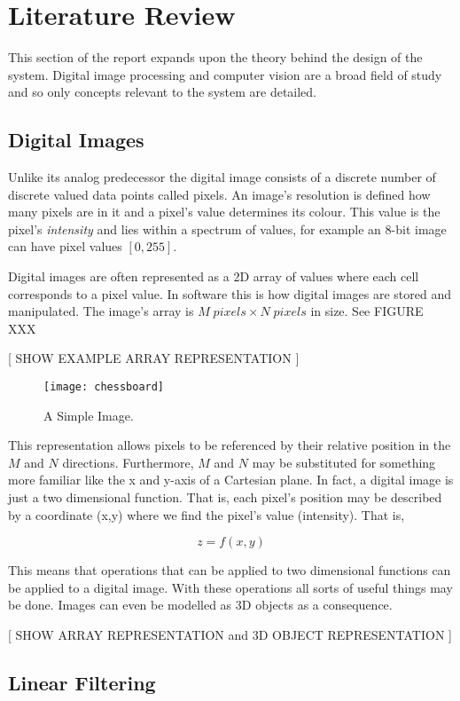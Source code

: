 \chapter{Literature Review}
This section of the report expands upon the theory behind the design of the system. Digital image processing and computer vision are a broad field of study and so only concepts relevant to the system are detailed.

\section{Digital Images}
Unlike its analog predecessor the digital image consists of a discrete number of discrete valued data points called pixels. An image's resolution is defined how many pixels are in it and a pixel's value determines its colour. This value is the pixel's \emph{intensity} and lies within a spectrum of values, for example an 8-bit image can have pixel values $[0, 255]$. 

Digital images are often represented as a 2D array of values where each cell corresponds to a pixel value. In software this is how digital images are stored and manipulated. The image's array is $M\;pixels\times N\; pixels$ in size. See FIGURE XXX

[ SHOW EXAMPLE ARRAY REPRESENTATION ]

\begin{figure}[htp]
    \centering
    \texttt{[image: chessboard]}
    \caption{A Simple Image.}
    \label{fig:galaxy}
\end{figure}

This representation allows pixels to be referenced by their relative position in the $M$ and $N$ directions. Furthermore, $M$ and $N$ may be substituted for something more familiar like the x and y-axis of a Cartesian plane. In fact, a digital image is just a two dimensional function. That is, each pixel's position may be described by a coordinate (x,y) where we find the pixel's value (intensity). That is, 

\[z = f(x,y)\]

This means that operations that can be applied to two dimensional functions can be applied to a digital image. With these operations all sorts of useful things may be done. Images can even be modelled as 3D objects as a consequence.

[ SHOW ARRAY REPRESENTATION and 3D OBJECT REPRESENTATION  ]




\section{Linear Filtering}

